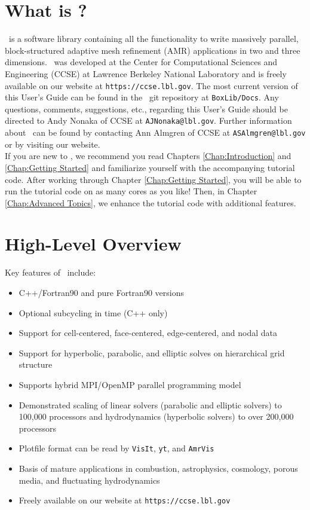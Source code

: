 \section{What is \BoxLib?}

\BoxLib\ is a software library containing all the functionality to write massively parallel, 
block-structured adaptive mesh refinement (AMR) applications in two and three dimensions.
\BoxLib\ was developed at the Center for Computational Sciences and Engineering (CCSE) at 
Lawrence Berkeley National Laboratory and is freely available on our website
at {\tt https://ccse.lbl.gov}.  The most current version of this User's Guide
can be found in the \BoxLib\ git repository at {\tt BoxLib/Docs}.  Any questions,
comments, suggestions, etc., regarding this User's Guide should be directed
to Andy Nonaka of CCSE at {\tt AJNonaka@lbl.gov}.  Further information 
about \BoxLib\ can be found by contacting Ann Almgren of CCSE at 
{\tt ASAlmgren@lbl.gov} or by visiting our website.\\

If you are new to \BoxLib, we recommend you read Chapters \ref{Chap:Introduction} and
\ref{Chap:Getting Started} and familiarize yourself with the accompanying tutorial code.
After working through Chapter \ref{Chap:Getting Started}, you will be able to run the tutorial
code on as many cores as you like!  Then, in Chapter \ref{Chap:Advanced Topics}, we enhance 
the tutorial code with additional features.

\section{High-Level Overview}

Key features of \BoxLib\ include:
\begin{itemize}
\item C++/Fortran90 and pure Fortran90 versions
\item Optional subcycling in time (C++ only)
\item Support for cell-centered, face-centered, edge-centered, and nodal data
\item Support for hyperbolic, parabolic, and elliptic solves on hierarchical grid structure
\item Supports hybrid MPI/OpenMP parallel programming model
\item Demonstrated scaling of linear solvers (parabolic and elliptic solvers) to 100,000 processors and 
      hydrodynamics (hyperbolic solvers) to over 200,000 processors
\item Plotfile format can be read by {\tt VisIt}, {\tt yt}, and {\tt AmrVis}
\item Basis of mature applications in combustion, astrophysics, cosmology, porous media, and fluctuating hydrodynamics
\item Freely available on our website at {\tt https://ccse.lbl.gov}
\end{itemize}

